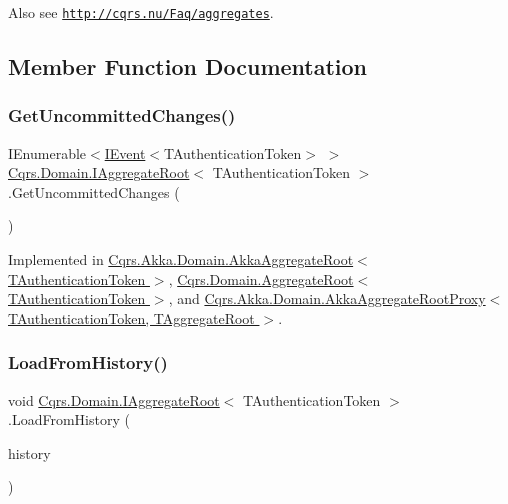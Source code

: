 Also see \href{http://cqrs.nu/Faq/aggregates}{\tt http\+://cqrs.\+nu/\+Faq/aggregates}. 

\subsection{Member Function Documentation}
\mbox{\label{interfaceCqrs_1_1Domain_1_1IAggregateRoot_a22fda414613f5ac0d4371554d7d6473b}} 
\subsubsection{\texorpdfstring{Get\+Uncommitted\+Changes()}{GetUncommittedChanges()}}
{\footnotesize\ttfamily I\+Enumerable$<$\hyperlink{interfaceCqrs_1_1Events_1_1IEvent}{I\+Event}$<$T\+Authentication\+Token$>$ $>$ \hyperlink{interfaceCqrs_1_1Domain_1_1IAggregateRoot}{Cqrs.\+Domain.\+I\+Aggregate\+Root}$<$ T\+Authentication\+Token $>$.Get\+Uncommitted\+Changes (\begin{DoxyParamCaption}{ }\end{DoxyParamCaption})}



Implemented in \hyperlink{classCqrs_1_1Akka_1_1Domain_1_1AkkaAggregateRoot_a2d11510fec0129ba318f63f7103aeec0}{Cqrs.\+Akka.\+Domain.\+Akka\+Aggregate\+Root$<$ T\+Authentication\+Token $>$}, \hyperlink{classCqrs_1_1Domain_1_1AggregateRoot_a625e885ec7885a686f729ed1efe3a8fa}{Cqrs.\+Domain.\+Aggregate\+Root$<$ T\+Authentication\+Token $>$}, and \hyperlink{classCqrs_1_1Akka_1_1Domain_1_1AkkaAggregateRootProxy_afa620ced4762b0539da23ca063fed489}{Cqrs.\+Akka.\+Domain.\+Akka\+Aggregate\+Root\+Proxy$<$ T\+Authentication\+Token, T\+Aggregate\+Root $>$}.

\mbox{\label{interfaceCqrs_1_1Domain_1_1IAggregateRoot_afe9329ee26ae68613059189ca64dfe60}} 
\subsubsection{\texorpdfstring{Load\+From\+History()}{LoadFromHistory()}}
{\footnotesize\ttfamily void \hyperlink{interfaceCqrs_1_1Domain_1_1IAggregateRoot}{Cqrs.\+Domain.\+I\+Aggregate\+Root}$<$ T\+Authentication\+Token $>$.Load\+From\+History (\begin{DoxyParamCaption}\item[{I\+Enumerable$<$ \hyperlink{interfaceCqrs_1_1Events_1_1IEvent}{I\+Event}$<$ T\+Authentication\+Token $>$$>$}]{history }\end{DoxyParamCaption})}



